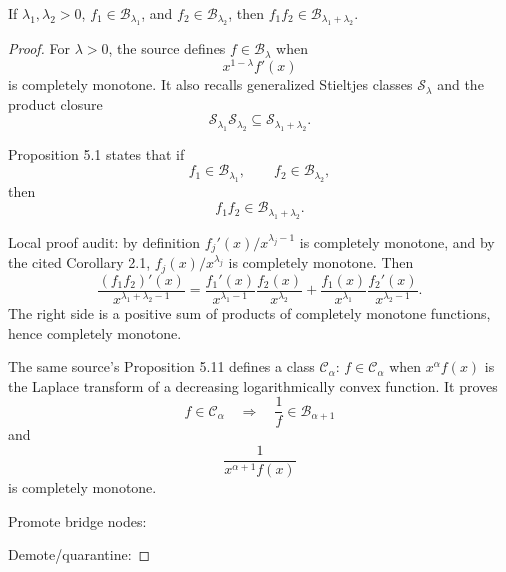 \begin{proposition}
\label{res:gbf-product-closure}
If \(\lambda_1,\lambda_2>0\), \(f_1\in\mathcal B_{\lambda_1}\), and \(f_2\in\mathcal B_{\lambda_2}\), then \(f_1f_2\in\mathcal B_{\lambda_1+\lambda_2}\).
\end{proposition}
\begin{proof}
For \(\lambda>0\), the source defines \(f\in\mathcal B_\lambda\) when
\[
x^{1-\lambda}f'(x)
\]
is completely monotone. It also recalls generalized Stieltjes classes \(\mathcal S_\lambda\) and the product closure
\[
\mathcal S_{\lambda_1}\mathcal S_{\lambda_2}\subseteq \mathcal S_{\lambda_1+\lambda_2}.
\]

Proposition 5.1 states that if
\[
f_1\in\mathcal B_{\lambda_1},\qquad f_2\in\mathcal B_{\lambda_2},
\]
then
\[
f_1f_2\in\mathcal B_{\lambda_1+\lambda_2}.
\]

Local proof audit: by definition \(f_j'(x)/x^{\lambda_j-1}\) is completely monotone, and by the cited Corollary 2.1, \(f_j(x)/x^{\lambda_j}\) is completely monotone. Then
\[
\frac{(f_1f_2)'(x)}{x^{\lambda_1+\lambda_2-1}}
=
\frac{f_1'(x)}{x^{\lambda_1-1}}\frac{f_2(x)}{x^{\lambda_2}}
+
\frac{f_1(x)}{x^{\lambda_1}}\frac{f_2'(x)}{x^{\lambda_2-1}}.
\]
The right side is a positive sum of products of completely monotone functions, hence completely monotone.

The same source's Proposition 5.11 defines a class \(\mathcal C_\alpha\): \(f\in\mathcal C_\alpha\) when \(x^\alpha f(x)\) is the Laplace transform of a decreasing logarithmically convex function. It proves
\[
f\in\mathcal C_\alpha
\quad\Longrightarrow\quad
\frac1f\in\mathcal B_{\alpha+1}
\]
and
\[
\frac{1}{x^{\alpha+1}f(x)}
\]
is completely monotone.

Promote bridge nodes:

Demote/quarantine:
\end{proof}

